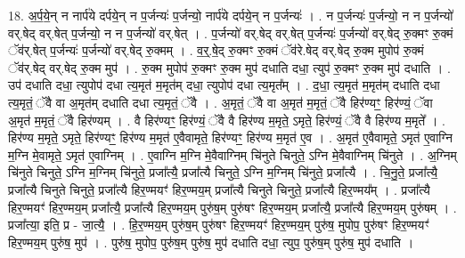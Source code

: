 \documentclass[17pt]{extarticle}
\begin{document}
18. अ॒र्प॒ये॒न् न नार्प॑ये दर्पये॒न् न प॒र्जन्यः॑ प॒र्जन्यो॒ नार्प॑ये दर्पये॒न् न प॒र्जन्यः॑ । . न प॒र्जन्यः॑ प॒र्जन्यो॒ न न प॒र्जन्यो॑ वर्.षेद् वर्.षेत् प॒र्जन्यो॒ न न प॒र्जन्यो॑ वर्.षेत् । . प॒र्जन्यो॑ वर्.षेद् वर्.षेत् प॒र्जन्यः॑ प॒र्जन्यो॑ वर्.षेद् रु॒क्मꣳ रु॒क्मं ॅव॑र्.षेत् प॒र्जन्यः॑ प॒र्जन्यो॑ वर्.षेद् रु॒क्मम् । . व॒र्॒.षे॒द् रु॒क्मꣳ रु॒क्मं ॅव॑रे.षेद् वर्.षेद् रु॒क्म मुपोप॑ रु॒क्मं ॅव॑र्.षेद् वर्.षेद् रु॒क्म मुप॑ । . रु॒क्म मुपोप॑ रु॒क्मꣳ रु॒क्म मुप॑ दधाति दधा॒ त्युप॑ रु॒क्मꣳ रु॒क्म मुप॑ दधाति । . उप॑ दधाति दधा॒ त्युपोप॑ दधा त्य॒मृत॑ म॒मृत॑म् दधा॒ त्युपोप॑ दधा त्य॒मृत᳚म् । . द॒धा॒ त्य॒मृत॑ म॒मृत॑म् दधाति दधा त्य॒मृतं॒ ॅवै वा अ॒मृत॑म् दधाति दधा त्य॒मृतं॒ ॅवै । . अ॒मृतं॒ ॅवै वा अ॒मृत॑ म॒मृतं॒ ॅवै हिर॑ण्यꣳ॒॒ हिर॑ण्यं॒ ॅवा अ॒मृत॑ म॒मृतं॒ ॅवै हिर॑ण्यम् । . वै हिर॑ण्यꣳ॒॒ हिर॑ण्यं॒ ॅवै वै हिर॑ण्य म॒मृते॒ ऽमृते॒ हिर॑ण्यं॒ ॅवै वै हिर॑ण्य म॒मृते᳚ । . हिर॑ण्य म॒मृते॒ ऽमृते॒ हिर॑ण्यꣳ॒॒ हिर॑ण्य म॒मृत॑ ए॒वैवामृते॒ हिर॑ण्यꣳ॒॒ हिर॑ण्य म॒मृत॑ ए॒व । . अ॒मृत॑ ए॒वैवामृते॒ ऽमृत॑ ए॒वाग्नि म॒ग्नि मे॒वामृते॒ ऽमृत॑ ए॒वाग्निम् । . ए॒वाग्नि म॒ग्नि मे॒वैवाग्निम् चि॑नुते चिनुते॒ ऽग्नि मे॒वैवाग्निम् चि॑नुते । . अ॒ग्निम् चि॑नुते चिनुते॒ ऽग्नि म॒ग्निम् चि॑नुते॒ प्रजा᳚त्यै॒ प्रजा᳚त्यै चिनुते॒ ऽग्नि म॒ग्निम् चि॑नुते॒ प्रजा᳚त्यै । . चि॒नु॒ते॒ प्रजा᳚त्यै॒ प्रजा᳚त्यै चिनुते चिनुते॒ प्रजा᳚त्यै हिर॒ण्मयꣳ॑ हिर॒ण्मय॒म् प्रजा᳚त्यै चिनुते चिनुते॒ प्रजा᳚त्यै हिर॒ण्मय᳚म् । . प्रजा᳚त्यै हिर॒ण्मयꣳ॑ हिर॒ण्मय॒म् प्रजा᳚त्यै॒ प्रजा᳚त्यै हिर॒ण्मय॒म् पुरु॑ष॒म् पुरु॑षꣳ हिर॒ण्मय॒म् प्रजा᳚त्यै॒ प्रजा᳚त्यै हिर॒ण्मय॒म् पुरु॑षम् । . प्रजा᳚त्या॒ इति॒ प्र - जा॒त्यै॒ । . हि॒र॒ण्मय॒म् पुरु॑ष॒म् पुरु॑षꣳ हिर॒ण्मयꣳ॑ हिर॒ण्मय॒म् पुरु॑ष॒ मुपोप॒ पुरु॑षꣳ हिर॒ण्मयꣳ॑ हिर॒ण्मय॒म् पुरु॑ष॒ मुप॑ । . पुरु॑ष॒ मुपोप॒ पुरु॑ष॒म् पुरु॑ष॒ मुप॑ दधाति दधा॒ त्युप॒ पुरु॑ष॒म् पुरु॑ष॒ मुप॑ दधाति । \newline
\end{document}

